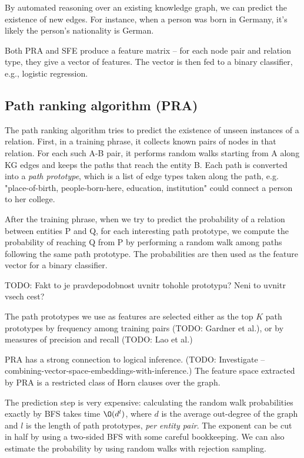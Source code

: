 By automated reasoning over an existing knowledge graph, we can predict the
existence of new edges. For instance, when a person was born in Germany, it's
likely the person's nationality is German.

Both PRA and SFE produce a feature matrix -- for each node pair and relation
type, they give a vector of features. The vector is then fed to a binary
classifier, e.g., logistic regression.

\subsection{Path ranking algorithm (PRA)}
\label{path-ranking-algorithm}

The path ranking algorithm\cite{path-ranking-algorithm}
tries to predict the existence of unseen instances of a relation.
First, in a training phrase, it collects known pairs of nodes in that relation.
For each such A-B pair, it performs random walks starting from A along KG edges
and keeps the paths that reach the entity B. Each path is converted into a
\textit{path prototype}, which is a list of edge types taken along the path, e.g.
"place-of-birth, people-born-here, education, institution" could connect a
person to her college.

After the training phrase, when we try to predict the probability of a relation
between entities P and Q, for each interesting path prototype, we compute the
probability of reaching Q from P by performing a random walk among paths
following the same path prototype.
The probabilities are then used as the feature vector for a binary classifier.

TODO: Fakt to je pravdepodobnost uvnitr tohohle prototypu? Neni to uvnitr vsech
cest?

The path prototypes we use as features are selected either as the top $K$ path
prototypes by frequency among training pairs (TODO: Gardner et al.), or by
measures of precision and recall (TODO: Lao et al.)

PRA has a strong connection to logical inference. (TODO: Investigate --
combining-vector-space-embeddings-with-inference.)
The feature space extracted by PRA is a restricted class of Horn clauses over
the graph.\cite{subgraph-feature-extraction}

The prediction step is very expensive: calculating the random walk
probabilities exactly by BFS takes time $\O(d^l)$, where $d$ is the
average out-degree of the graph and $l$ is the length of path prototypes,
\textit{per entity pair}.
The exponent can be cut in half by using a two-sided BFS with some careful
bookkeeping. We can also estimate the probability by using random walks with
rejection sampling.

